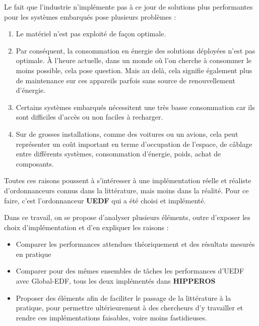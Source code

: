 	Le fait que l'industrie n'implémente pas à ce jour de solutions plus \og performantes \fg{} 
	pour les systèmes embarqués pose plusieurs problèmes :
	\begin{enumerate}
		\item Le matériel n'est pas exploité de façon optimale.
		\item Par conséquent, la consommation en énergie des solutions déployées n'est 
		pas optimale.
		À l'heure actuelle, dans un monde où l'on cherche à consommer le moins possible, 
		cela pose question. Mais au delà, cela signifie également plus de maintenance 
		sur ces appareils parfois sans source de renouvellement d'énergie.
		\item Certains systèmes embarqués nécessitent une très basse consommation car 
		ils sont difficiles d'accès ou non faciles à recharger.
		\item Sur de grosses installations, comme des voitures ou un avions, cela peut représenter 
		un coût important en terme d'occupation de l'espace, de câblage entre différents systèmes, 
		consommation d'énergie, poids, achat de composants.
	\end{enumerate}
	
	Toutes ces raisons poussent à s'intéresser à une implémentation réelle et réaliste 
	d'ordonnanceurs connus dans la littérature, mais moins dans la réalité. Pour ce faire, c'est 
	l'ordonnanceur \textbf{UEDF} qui a été choisi et implémenté. 
	
Dans ce travail, on se propose d’analyser plusieurs éléments, outre d’exposer les choix d’implémentation et d’en expliquer les raisons : \medskip
	\begin{itemize}
		\item Comparer les performances attendues théoriquement et des résultats mesurés en pratique
		\item Comparer pour des mêmes ensembles de tâches les performances d’UEDF avec Global-EDF, tous les deux implémentés
		dans \textbf{HIPPEROS}
		\item Proposer des éléments afin de faciliter le passage de la littérature à la pratique, pour permettre
		ultérieurement à des chercheurs d'y travailler et rendre ces implémentations 
		faisables, voire moins fastidieuses.
	\end{itemize}
	
